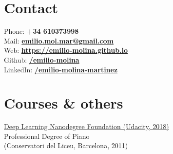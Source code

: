 \documentclass[]{deedy-resume-openfont}
\begin{document}
%
%
\lastupdated

%
%

%
%

\begin{minipage}[t]{0.30\textwidth} 



\section{Contact} 
Phone: {\bf +34 610373998}\\
Mail: \href{mailto:emilio.mol.mar@gmail.com}{\bf emilio.mol.mar@gmail.com}\\
Web: \href{https://emilio-molina.github.io/}{\bf https://emilio-molina.github.io}\\
Github: \href{https://github.com/emilio-molina}{\bf /emilio-molina} \\
LinkedIn: \href{https://www.linkedin.com/in/emilio-molina-martinez/}{\bf /emilio-molina-martinez}




\vspace{0.5cm}
\section{Courses \& others}
\href{https://confirm.udacity.com/ZW9LLAGZ}{Deep Learning Nanodegree Foundation (Udacity, 2018)} \\
Professional Degree of Piano\\(Conservatori del Liceu, Barcelona, 2011)
\vspace{0.5cm}


\end{minipage}
\end{document}
